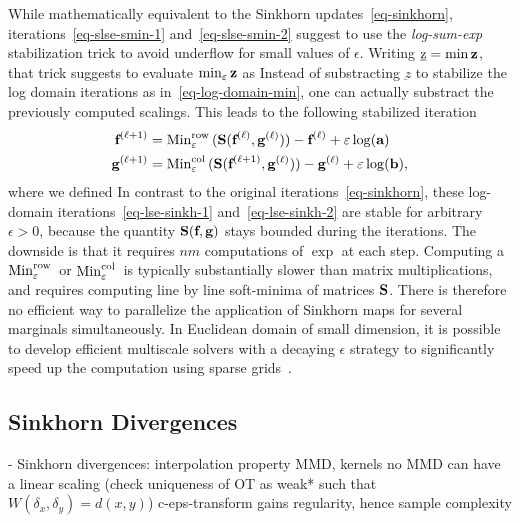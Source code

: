 While mathematically equivalent to the Sinkhorn updates~\eqref{eq-sinkhorn}, iterations~\eqref{eq-slse-smin-1} and~\eqref{eq-slse-smin-2} suggest to use the \emph{log-sum-exp} stabilization trick to avoid underflow for small values of $\epsilon$. Writing $\underbar{z}=\min \mathrm{\textbf{\upshape z}}$, that trick suggests to evaluate $\text{min}_\varepsilon\, \mathrm{\textbf{\upshape z}}$ as
Instead of substracting $\underbar{z}$ to stabilize the log domain iterations as in~\eqref{eq-log-domain-min}, one can actually substract the previously computed scalings. 
This leads to the following stabilized iteration
\begin{align}
	\label{eq-lse-sinkh-1}\mathrm{\textbf{\upshape f}}^{(\ell+1)} &= \text{Min}^{\text{row}}_\varepsilon\,( \mathrm{\textbf{\upshape S}}(\mathrm{\textbf{\upshape f}}^{(\ell)},\mathrm{\textbf{\upshape g}}^{(\ell)}))  - \mathrm{\textbf{\upshape f}}^{(\ell)} + \varepsilon\log(\mathrm{\textbf{\upshape a}}) \\
	\label{eq-lse-sinkh-2}\mathrm{\textbf{\upshape g}}^{(\ell+1)} &= \text{Min}^{\text{col}}_\varepsilon\,( \mathrm{\textbf{\upshape S}}(\mathrm{\textbf{\upshape f}}^{(\ell+1)},\mathrm{\textbf{\upshape g}}^{(\ell)})) - \mathrm{\textbf{\upshape g}}^{(\ell)} + \varepsilon \log(\mathrm{\textbf{\upshape b}}), 
\end{align}
where we defined
In contrast to the original iterations~\eqref{eq-sinkhorn}, these log-domain iterations~\eqref{eq-lse-sinkh-1} and~\eqref{eq-lse-sinkh-2} are stable for arbitrary $\epsilon>0$,
because the quantity $\mathrm{\textbf{\upshape S}}(\mathrm{\textbf{\upshape f}},\mathrm{\textbf{\upshape g}})$ stays bounded during the iterations. 
The downside is that it requires $nm$ computations of $\exp$ at each step. 
Computing a $\text{Min}^{\text{row}}_\varepsilon\,$ or $\text{Min}^{\text{col}}_\varepsilon\,$ is typically substantially slower than matrix multiplications, and requires computing line by line soft-minima of matrices $\mathrm{\textbf{\upshape S}}$. There is therefore no efficient way to parallelize the application of Sinkhorn maps for several marginals simultaneously.
%
In Euclidean domain of small dimension, it is possible to develop efficient multiscale solvers with a decaying $\epsilon$ strategy to significantly speed up the computation using sparse grids~\cite{schmitzer2016stabilized}.





\subsection{Sinkhorn Divergences}

- Sinkhorn divergences:
   interpolation property 
   MMD, kernels 
   no MMD can have a linear scaling (check uniqueness of OT as weak* such that $W(\delta_x,\delta_y)=d(x,y)$)
   c-eps-transform gains regularity, hence sample complexity 
